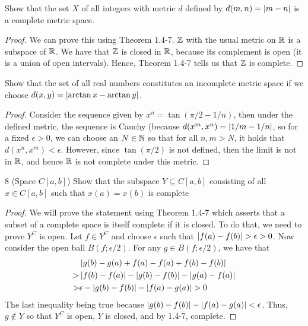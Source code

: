 \begin{exercise}{5}
Show that the set $X$ of all integers with metric $d$ defined by $d(m,n)=\left\lvert m-n\right\rvert$ is a complete metric space.
\end{exercise}
\begin{proof}
We can prove this using Theorem 1.4-7. $\mathbb{Z}$ with the usual metric on $\mathbb{R}$ is a subspace of $\mathbb{R}$. We have that $\mathbb{Z}$  is closed in $\mathbb{R}$, because its complement is open (it is a union of open intervals). Hence, Theorem 1.4-7 tells us that $\mathbb{Z}$ is complete.
\end{proof}

\begin{exercise}{6}
Show that the set of all real numbers constitutes an incomplete metric space if we choose $d(x,y)=\left\lvert \arctan x-\arctan y\right\rvert$.
\end{exercise}
\begin{proof}
Consider the sequence given by $x^n=\tan(\pi/2-1/n)$, then under the defined metric, the sequence is Cauchy (because $d(x^m,x^n)=\left\lvert 1/m-1/n\right\rvert$, so for a fixed $\epsilon>0$, we can choose an $N\in\mathbb{N}$ so that for all $n,m>N$, it holds that $d(x^n,x^m)<\epsilon$. However, since $\tan(\pi/2)$ is not defined, then the limit is not in $\mathbb{R}$, and hence $\mathbb{R}$ is not complete under this metric.
\end{proof}

\begin{exercise}{8 (Space $C[a,b]$)}
Show that the subspace $Y\subseteq C[a,b]$ consisting of all $x\in C[a,b]$ such that $x(a)=x(b)$ is complete
\end{exercise}
\begin{proof}
We will prove the statement using Theorem 1.4-7 which asserts that a subset of a complete space is itself complete if it is closed. To do that, we need to prove $Y^C$ is open. Let $f\in Y^C$ and choose $\epsilon$ such that $\left\lvert f(a)-f(b)\right\rvert>\epsilon>0$. Now consider the open ball $B(f;\epsilon/2)$. For any $g\in B(f;\epsilon/2)$, we have that 
\begin{align*}
    &\left\lvert g(b)-g(a)+f(a)-f(a)+f(b)-f(b)\right\rvert \\
    >& \left\lvert f(b)-f(a)\right\rvert -\left\lvert g(b)-f(b)\right\rvert -\left\lvert g(a)-f(a)\right\rvert\\
    >& \epsilon-\left\lvert g(b)-f(b)\right\rvert-\left\lvert f(a)-g(a)\right\rvert>0
\end{align*}
 The last inequality being true because $\left\lvert g(b)-f(b)\right\rvert-\left\lvert f(a)-g(a)\right\rvert<\epsilon$. Thus, $g\notin Y$ so that $Y^C$ is open, $Y$ is closed, and by 1.4-7, complete.
\end{proof}

